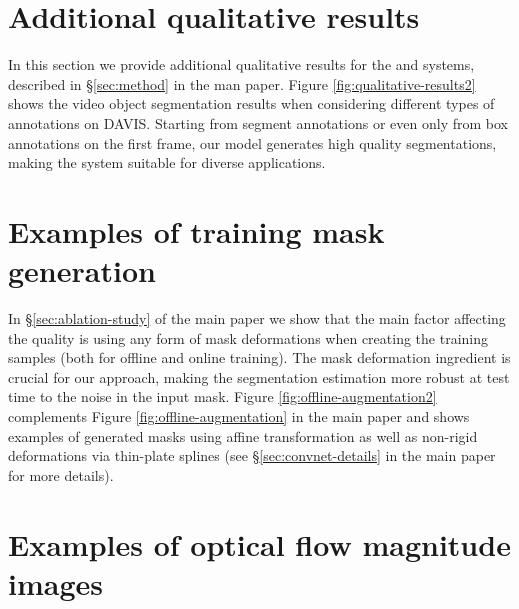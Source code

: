 \documentclass[10pt,twocolumn,letterpaper]{article}
\begin{document}
\section{Additional qualitative results}
\label{sec:add_qual_res}

In this section we provide additional qualitative results for the  and  systems, described in \S\ref{sec:method} in the man paper.
Figure \ref{fig:qualitative-results2} shows the video object segmentation results when considering different types of annotations on DAVIS. Starting from segment annotations or even only from box annotations
on the first frame, our model generates high quality segmentations, making the system suitable for diverse applications.


\section{Examples of training mask generation}
\label{sec:mask_gen}

In \S\ref{sec:ablation-study} of the main paper we show that the main factor affecting the quality is using any form of mask deformations when creating the training samples (both for offline and online training).
The mask deformation ingredient is crucial for our  approach, making the segmentation estimation more robust at test time to the noise in the input mask.
Figure \ref{fig:offline-augmentation2} complements Figure \ref{fig:offline-augmentation}  in the main paper and shows examples of generated masks using affine transformation as well as non-rigid deformations via thin-plate splines
(see \S\ref{sec:convnet-details} in the main paper for more details).


\section{Examples of optical flow magnitude images}
\label{sec:flow_gen}
\end{document}
